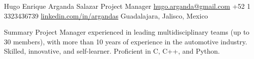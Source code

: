 \documentclass[10pt, letterpaper]{article} %
\begin{document}

\customheader
{Hugo Enrique Arganda Salazar}
{Project Manager}
{\href{mailto:hugo.arganda@gmail.com}{hugo.arganda@gmail.com}}
{+52 1 3323436739}
{\href{https://www.linkedin.com/in/argandas}{linkedin.com/in/argandas}}
{Guadalajara, Jalisco, Mexico}


\summary
{Summary}
{Project Manager experienced in leading multidisciplinary teams (up to 30 members), with more than 10 years of experience in the automotive industry. Skilled, innovative, and self-learner. Proficient in C, C++, and Python.}







\end{document}

